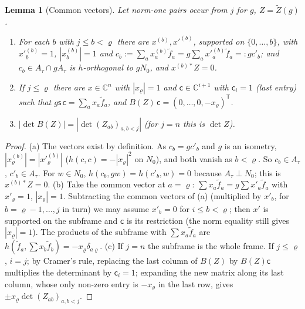 \documentclass[10pt]{amsart}
\newtheorem{lemma}[theorem]{Lemma}
\theoremstyle{definition}
\theoremstyle{remark}
\newcommand{\C}{\mathbb C}
\begin{document}
\begin{lemma}[Common vectors]\label{pbs:common}
Let norm-one pairs occur from $j$ for $g$, $Z=\tilde Z(g)$.
\begin{enumerate}
\item[(a)] For each $b$ with $j\le b<\varrho$ there are $x^{(b)},x'^{(b)}$, supported on $\{0,\dots,
b\}$, with $x'^{(b)}_b=1$, $|x^{(b)}_b|=1$ and $c_b:=\sum_ax^{(b)}_a\tilde f_a=g\sum_ax'^{(b)}_a\tilde
f_a=:gc'_b$; and $c_b\in A_\tau\cap gA_\tau$ is $h$-orthogonal to $gN_0$, and $x^{(b)*}Z=0$.
\item[(b)] If $j\le\varrho$ there are $x\in\C^n$ with $|x_\varrho|=1$ and $\mathsf c\in\C^{i+1}$ with
$\mathsf c_{i}=1$ (last entry) such that $g\mathsf s\,\mathsf c=\sum_ax_a\tilde f_a$, and $B(Z)\,\mathsf c
=(0,\dots,0,-x_\varrho)^{\mathsf T}$.
\item[(c)] $|\det B(Z)|=|\det(Z_{ab})_{a,b<j}|$ (for $j=n$ this is $\det Z$).
\end{enumerate}
\end{lemma}
\begin{proof}
(a) The vectors exist by definition. As $c_b=gc'_b$ and $g$ is an isometry, $|x^{(b)}_\varrho|=|x'^{(b)
}_\varrho|$ ($h(c,c)=-|x_\varrho|^2$ on $N_0$), and both vanish as $b<\varrho$. So $c_b\in A_\tau$, $c'_b\in
A_\tau$. For $w\in N_0$, $h(c_b,gw)=h(c'_b,w)=0$ because $A_\tau\perp N_0$; this is $x^{(b)*}Z=0$.
(b) Take the common vector at $a=\varrho$: $\sum x_a\tilde f_a=g\sum x'_a\tilde f_a$ with $x'_\varrho=1$,
$|x_\varrho|=1$. Subtracting the common vectors of (a) (multiplied by $x'_b$, for $b=\varrho-1,\dots,j$
in turn) we may assume $x'_b=0$ for $i\le b<\varrho$; then $x'$ is supported on the subframe and
$\mathsf c$ is its restriction (the norm equality still gives $|x_\varrho|=1$). The products of the
subframe with $\sum x_a\tilde f_a$ are $h(\tilde f_a,\sum x_b\tilde f_b)=-x_\varrho\delta_{a\varrho}$.
(c) If $j=n$ the subframe is the whole frame. If $j\le\varrho$, $i=j$; by Cramer's rule, replacing the
last column of $B(Z)$ by $B(Z)\mathsf c$ multiplies the determinant by $\mathsf c_i=1$; expanding the new
matrix along its last column, whose only non-zero entry is $-x_\varrho$ in the last row, gives $\pm
x_\varrho\det(Z_{ab})_{a,b<j}$.
\end{proof}
\end{document}
